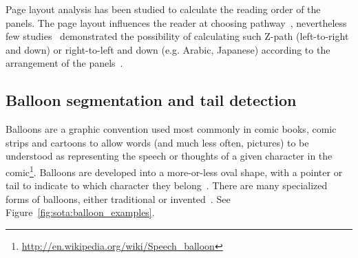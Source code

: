 Page layout analysis has been studied to calculate the reading order of the panels.
The page layout influences the reader at choosing pathway~\cite{Cohn_2013}, nevertheless few studies~\cite{Guerin2012Ontologies,Ponsard09,Arai2010Automatic} demonstrated the possibility of calculating such Z-path (left-to-right and down) or right-to-left and down (e.g. Arabic, Japanese) according to the arrangement of the panels~\cite{Li2013Comic,Tsai2013Adaptive,Liu2014Automatic}. 

\subsection{Balloon segmentation and tail detection}
\label{sec:sota:balloon_segmentation}

Balloons are a graphic convention used most commonly in comic books, comic strips and cartoons to allow words (and much less often, pictures) to be understood as representing the speech or thoughts of a given character in the comic\footnote{\url{http://en.wikipedia.org/wiki/Speech_balloon}}.
Balloons are developed into a more-or-less oval shape, with a pointer or tail to indicate to which character they belong~\cite{Goggin2010Rise,Varnum2007Language}.
There are many specialized forms of balloons, either traditional or invented~\cite{Marx2006Writing}.
See Figure~\ref{fig:sota:balloon_examples}.


